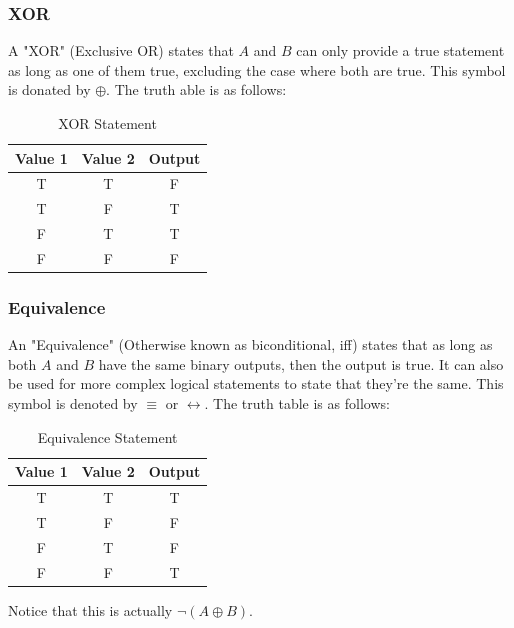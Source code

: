 \documentclass[a4paper]{article}
\theoremstyle{plain}
\theoremstyle{definition}
\theoremstyle{remark}
\begin{document}
\subsubsection{XOR}
A "XOR" (Exclusive OR) states that $A$ and $B$ can only provide a true statement as long as one of them true, excluding the case where both are true. This symbol is donated by $\oplus$. The truth able is as follows:
\begin{table}[H]
	\centering
	\caption{XOR Statement}
	\label{tab:XOR}
	\begin{tabular}{ccc}
		\hline
		Value 1 & Value 2  & Output \\
		\hline
		T & T & F \\
		T & F & T \\
		F & T & T \\
		F & F & F \\
		\hline
	\end{tabular}
\end{table}
\newpage
\subsubsection{Equivalence}
An "Equivalence" (Otherwise known as biconditional, iff) states that as long as both $A$ and $B$ have the same binary outputs, then the output is true. It can also be used for more complex logical statements to state that they're the same. This symbol is denoted by  $\equiv$ or $\leftrightarrow$. The truth table is as follows:
\begin{table}[H]
	\centering
	\caption{Equivalence Statement}
	\label{tab:Equivalence}
	\begin{tabular}{ccc}
		\hline
		Value 1 & Value 2 & Output \\
		\hline
		T & T & T \\
		T & F & F \\
		F & T & F \\
		F & F & T \\
		\hline
	\end{tabular}
\end{table}
Notice that this is actually $\neg\left( A \oplus B \right) $.
\end{document}
